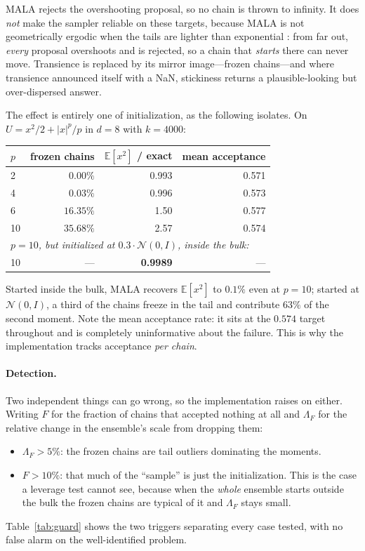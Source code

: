 \documentclass[11pt]{article}
\newcommand{\E}{\mathbb{E}}
\begin{document}
MALA rejects the overshooting proposal, so no chain is thrown to infinity. It does \emph{not}
make the sampler reliable on these targets, because MALA is not geometrically ergodic when the
tails are lighter than exponential \cite{robertstweedie}: from far out, \emph{every} proposal
overshoots and is rejected, so a chain that \emph{starts} there can never move. Transience is
replaced by its mirror image---frozen chains---and where transience announced itself with a NaN,
stickiness returns a plausible-looking but over-dispersed answer.

The effect is entirely one of initialization, as the following isolates. On
$U = x^2/2 + |x|^p/p$ in $d=8$ with $k=4000$:

\begin{center}
\begin{tabular}{lrrr}
\toprule
$p$ & frozen chains & $\E[x^2]$ / exact & mean acceptance \\
\midrule
2  & $0.00\%$  & 0.993 & 0.571 \\
4  & $0.03\%$  & 0.996 & 0.573 \\
6  & $16.35\%$ & 1.50  & 0.577 \\
10 & $35.68\%$ & 2.57  & 0.574 \\
\midrule
\multicolumn{4}{l}{\emph{$p=10$, but initialized at $0.3\cdot\mathcal{N}(0,I)$, inside the bulk:}} \\
10 & --- & \textbf{0.9989} & --- \\
\bottomrule
\end{tabular}
\end{center}

Started inside the bulk, MALA recovers $\E[x^2]$ to $0.1\%$ even at $p=10$; started at
$\mathcal{N}(0,I)$, a third of the chains freeze in the tail and contribute $63\%$ of the second
moment. Note the mean acceptance rate: it sits at the $0.574$ target throughout and is
completely uninformative about the failure. This is why the implementation tracks acceptance
\emph{per chain}.

\paragraph{Detection.} Two independent things can go wrong, so the implementation raises on
either. Writing $F$ for the fraction of chains that accepted nothing at all and $\Lambda_F$ for
the relative change in the ensemble's scale from dropping them:
\begin{itemize}[leftmargin=1.3em,itemsep=2pt]
  \item $\Lambda_F > 5\%$: the frozen chains are tail outliers dominating the moments.
  \item $F > 10\%$: that much of the ``sample'' is just the initialization. This is the case a
  leverage test cannot see, because when the \emph{whole} ensemble starts outside the bulk the
  frozen chains are typical of it and $\Lambda_F$ stays small.
\end{itemize}
Table~\ref{tab:guard} shows the two triggers separating every case tested, with no false alarm
on the well-identified problem.
\end{document}
